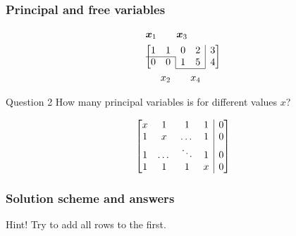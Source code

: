 \documentclass[fullscreen=true, bookmarks=true, hyperref={pdfencoding=unicode}]{beamer}
\begin{document}
\begin{frame}
  \frametitle{\textbf{Principal} and free variables}

  \begin{eqnarray*}
    \begin{matrix} \boldsymbol{x}_1 &  & \boldsymbol{x}_3 &  & \end{matrix} \quad\ \\
  \left[\begin{matrix}
    1 & 1 & 0 & 2 & \multicolumn{1}{|c}{3} \\
    \cline{1-2}
    0 & 0 & \multicolumn{1}{|c}{1} & 5 & \multicolumn{1}{|c}{4} \\
    \cline{3-4}
  \end{matrix}\right] \\
  \begin{matrix} & x_2 &  & x_4 &  \end{matrix} \quad
  \end{eqnarray*} 

  \pause

  \vspace{0.5cm}
  \begin{block}{Question 2}
    How many principal variables is for different values $x$?

    \begin{equation*}
      \left[\begin{matrix}
        x & 1 & 1 & 1 & \multicolumn{1}{|c}{0} \\
        1 & x & \dots & 1 & \multicolumn{1}{|c}{0} \\
        1 & \dots & \ddots & 1 & \multicolumn{1}{|c}{0} \\
        1 & 1 & 1 & x & \multicolumn{1}{|c}{0} \\
        \end{matrix}\right]
    \end{equation*}
  \end{block} 

\end{frame}


\begin{frame}
  \frametitle{Solution scheme and answers}

  \begin{block}{Hint!}
    Try to add all rows to the first.
  \end{block}
    
  \pause\vspace{1cm}
  \begin{center}    
  \end{center}
    
\end{frame}
\end{document}
